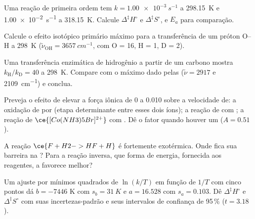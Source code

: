 \begin{exercise}[$\star\star$]\label{exo:b3:rate-theories:5}
Uma reação de primeira ordem tem $k = \qty{1.00e-3}{s^{-1}}$ a \qty{298.15}{K} e \qty{1.00e-2}{s^{-1}} a
\qty{318.15}{K}. Calcule $\Delta^{\ddagger}H^\circ$ e $\Delta^{\ddagger}S^\circ$, e $E_a$ para comparação.
\end{exercise}

\begin{exercise}[$\star\star$]\label{exo:b3:rate-theories:6}
Calcule o efeito isotópico primário máximo para a transferência de um próton O--H a
\qty{298}{K} ($\tilde\nu_{\mathrm{OH}} = \qty{3657}{cm^{-1}}$,  com O = 16, H = 1, D = 2).
\end{exercise}

\begin{exercise}[$\star\star$]\label{exo:b3:rate-theories:7}
Uma transferência enzimática de hidrogênio a partir de um carbono mostra $k_{\mathrm H}/k_{\mathrm D} = 40$ a \qty{298}{K}.
Compare com o máximo dado pelas  ($\tilde\nu = 2917$ e \qty{2109}{cm^{-1}}) e conclua.
\end{exercise}

\begin{exercise}[$\star\star$]\label{exo:b3:rate-theories:8}
Preveja o efeito de elevar a força iônica de 0 a 0.010 sobre a velocidade de:
a oxidação de  por  (etapa determinante entre esses dois íons); a
reação de  com ; a reação de $\ce{[Co(NH3)5Br]^{2+}}$ com .
Dê o fator quando houver um ($A = 0.51$).
\end{exercise}

\begin{exercise}[$\star\star$]\label{exo:b3:rate-theories:9}
A reação $\ce{F + H2 -> HF + H}$ é fortemente exotérmica. Onde fica sua barreira na
? Para a reação inversa, que forma de energia,
fornecida aos reagentes, a favorece melhor?
\end{exercise}

\begin{exercise}[$\star\star\star$]\label{exo:b3:rate-theories:10}
Um ajuste por mínimos quadrados de $\ln(k/T)$ em função de $1/T$ com cinco pontos dá $b = -7446$ K
com $s_b = \qty{31}{K}$ e $a = 16.528$ com $s_a = 0.103$. Dê $\Delta^{\ddagger}H^\circ$ e $\Delta^{\ddagger}S^\circ$ com
suas incertezas-padrão e seus intervalos de confiança de 95\,\% ($t = 3.18$).
\end{exercise}

